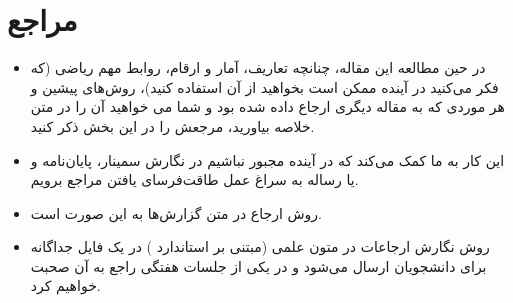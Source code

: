 \documentclass[a4paper,11pt]{article}
\newcommand*\tick{\item[\Checkmark]}
\begin{document}
    \section{مراجع}\label{sec:ref}

    \begin{itemize}
        \tick {در حین مطالعه این مقاله، چنانچه تعاریف، آمار و ارقام، روابط مهم ریاضی (که فکر می‌کنید در آینده ممکن است بخواهید از آن استفاده کنید)، روش‌های پیشین و هر موردی که به مقاله دیگری ارجاع داده شده بود و شما می خواهید آن را در متن خلاصه بیاورید، مرجعش را در این بخش ذکر کنید.}
        \tick {این کار به ما کمک می‌کند که در آینده مجبور نباشیم در نگارش سمینار، پایان‌نامه و یا رساله به سراغ عمل طاقت‌فرسای یافتن مراجع برویم.}
        \tick {روش ارجاع در متن گزارش‌ها به این صورت است\cite{keshav2007read}.}
        \tick {روش نگارش ارجاعات در متون علمی (مبتنی بر استاندارد ) در یک فایل جداگانه برای دانشجویان ارسال می‌شود و در یکی از جلسات هفتگی راجع به آن صحبت خواهیم کرد.}
    \end{itemize}

    \setLTRbibitems
    
    
    \resetlatinfont
\end{document}
